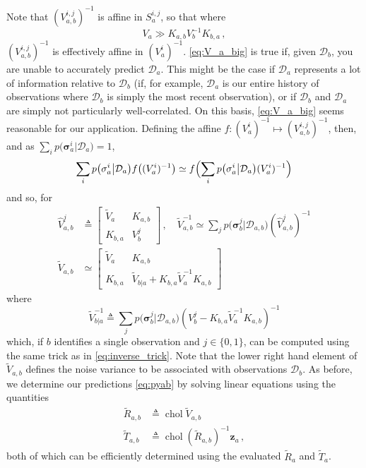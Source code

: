 \documentclass{article}
\newcommand{\cm}[1]{\ensuremath{\mathcal{#1}}}
\newcommand{\bm}[1]{\ensuremath{\mathbf{#1}}}
\newcommand{\data}{\ensuremath{\cm{D}}}
\newcommand{\vect}[1]{\bm{#1}}
\newcommand{\vz}{\vect{z}}
\newcommand{\vs}{\vect{\sigma}}
\newcommand{\fPr}{p}
\newcommand{\Prob}[2]{\fPr\bigl(#1\big\vert#2\bigr)}
\newcommand{\defequal}{\triangleq}
\DeclareMathOperator{\chol}{chol}
\begin{document}
Note that $({V}^{i,j}_{a,b})^{-1}$ is affine in $S^{i,j}_a$, so that where
\begin{equation}\label{eq:V_a_big}
 V_a \gg K_{a,b} V_b^{-1} K_{b,a}\,,
\end{equation}
$({V}^{i,j}_{a,b})^{-1}$ is effectively affine in $(V^i_a)^{-1}$. \eqref{eq:V_a_big} is true if, given $\data_b$, you are unable to accurately predict $\data_a$. This might be the case if $\data_a$ represents a lot of information relative to $\data_b$ (if, for example, $\data_a$ is our entire history of observations where $\data_b$ is simply the most recent observation), or if $\data_b$ and $\data_a$ are simply not particularly well-correlated. On this basis, \eqref{eq:V_a_big} seems reasonable for our application. Defining the affine $f: (V^i_a)^{-1} \mapsto ({V}^{i,j}_{a,b})^{-1}$, then, and as
$\sum_i \Prob{\vs^i_{a}}{\data_{a}} = 1$,
$$
\sum_i \Prob{\vs^i_{a}}{\data_{a}} f\bigl((V^i_a)^{-1} \bigr) \simeq f\Bigl(\sum_i \Prob{\vs^i_{a}}{\data_{a}}(V^i_a)^{-1} \Bigr)
$$
and so, for
\begin{align*}
\hat{V}^{j}_{a,b} & \defequal
\begin{bmatrix}
 \tilde{V}_a & K_{a,b}\\
 K_{b,a} & V^j_b
\end{bmatrix}
\,,
\quad
 \tilde{V}^{-1}_{a,b} \simeq \sum_j \Prob{\vs^j_{b}}{\data_{a,b}} (\hat{V}^{j}_{a,b})^{-1}
\nonumber\\
 \tilde{V}_{a,b} & \simeq
\begin{bmatrix}
 \tilde{V}_a & K_{a,b}\\
 K_{b,a} & \tilde{V}_{b|a} + K_{b,a} \tilde{V}_a^{-1} K_{a,b}
\end{bmatrix}
\end{align*}
where
\begin{equation*}
 \tilde{V}^{-1}_{b|a} \defequal \sum_j \Prob{\vs^j_{b}}{\data_{a,b}} (V^j_b -K_{b,a} \tilde{V}_a^{-1}K_{a,b})^{-1}
\end{equation*}
which, if $b$ identifies a single observation and $j\in\{0,1\}$, can be computed using the same trick as in \eqref{eq:inverse_trick}. Note that the lower right hand element of $\tilde{V}_{a,b}$ defines the noise variance to be associated with observations $\data_b$. As before, we determine our predictions \eqref{eq:pyab} by solving linear equations using the quantities
\begin{align}
 \tilde{R}_{a,b} & \defequal \chol \tilde{V}_{a,b} \label{eq:Rab} \\
 \tilde{T}_{a,b} & \defequal \chol (\tilde{R}_{a,b})^{-1} \vz_a \label{eq:Tab} \,,
\end{align}
both of which can be efficiently determined \citep[Appendix B]{osbornebayesian} using the evaluated $\tilde{R}_a$ and $\tilde{T}_a$.
\end{document}
